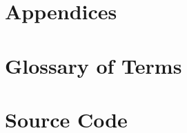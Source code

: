 \chapter{Appendices}

\appendix
\chapter{Glossary of Terms}\label{sec:glosterm}

\printglossaries

\newpage
\chapter{Source Code}\label{sec:srccode}


